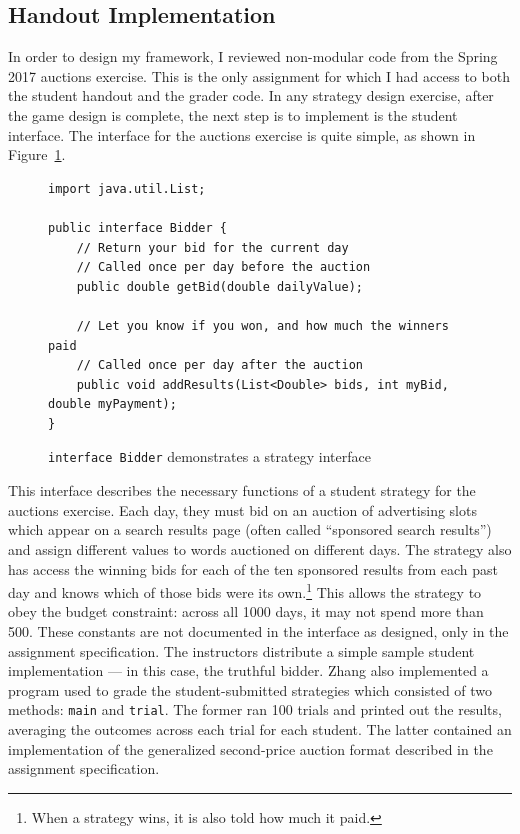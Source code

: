 \documentclass[pageno]{jpaper}
\begin{document}
\subsection*{Handout Implementation}
In order to design my framework, I reviewed non-modular code from the Spring 2017 auctions exercise.
This is the only assignment for which I had access to both the student handout and the grader code.
In any strategy design exercise, after the game design is complete, the next step is to implement is the student interface.
The interface for the auctions exercise is quite simple, as shown in Figure~\ref{minted:Bidder}.
\begin{figure}[hbt]
\begin{verbatim}
import java.util.List;

public interface Bidder {
    // Return your bid for the current day
    // Called once per day before the auction
    public double getBid(double dailyValue);

    // Let you know if you won, and how much the winners paid
    // Called once per day after the auction
    public void addResults(List<Double> bids, int myBid, double myPayment);
}
\end{verbatim}
  \caption{\texttt{interface Bidder} demonstrates a strategy interface}\label{minted:Bidder}
\end{figure}
This interface describes the necessary functions of a student strategy for the auctions exercise.
Each day, they must bid on an auction of advertising slots which appear on a search results page (often called ``sponsored search results'') and assign different values to words auctioned on different days.
The strategy also has access the winning bids for each of the ten sponsored results from each past day and knows which of those bids were its own.\footnote{When a strategy wins, it is also told how much it paid.}
This allows the strategy to obey the budget constraint: across all 1000 days, it may not spend more than 500.
These constants are not documented in the interface as designed, only in the assignment specification.
The instructors distribute a simple sample student implementation --- in this case, the truthful bidder.
Zhang also implemented a program used to grade the student-submitted strategies which consisted of two methods: \texttt{main} and \texttt{trial}.
The former ran 100 trials and printed out the results, averaging the outcomes across each trial for each student.
The latter contained an implementation of the generalized second-price auction format described in the assignment specification.
\end{document}
